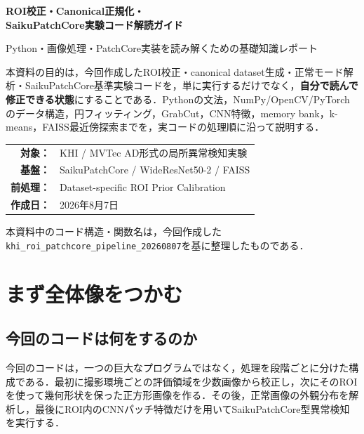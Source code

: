 \documentclass[a4paper,11pt]{ltjsreport}
\begin{document}
\begin{titlepage}
\centering
\vspace*{22mm}
{\Huge\bfseries\color{MainBlue} ROI校正・Canonical正規化・\\[2mm]SaikuPatchCore実験コード解読ガイド\par}
\vspace{8mm}
{\Large Python・画像処理・PatchCore実装を読み解くための基礎知識レポート\par}
\vspace{14mm}
\begin{tcolorbox}[width=0.88\linewidth,colback=LightGray,colframe=MainBlue,arc=2mm]
本資料の目的は，今回作成したROI校正・canonical dataset生成・正常モード解析・SaikuPatchCore基準実験コードを，単に実行するだけでなく，\textbf{自分で読んで修正できる状態}にすることである．Pythonの文法，NumPy/OpenCV/PyTorchのデータ構造，円フィッティング，GrabCut，CNN特徴，memory bank，k-means，FAISS最近傍探索までを，実コードの処理順に沿って説明する．
\end{tcolorbox}
\vfill
\begin{tabular}{rl}
\textbf{対象：} & KHI / MVTec AD形式の局所異常検知実験\\
\textbf{基盤：} & SaikuPatchCore / WideResNet50-2 / FAISS\\
\textbf{前処理：} & Dataset-specific ROI Prior Calibration\\
\textbf{作成日：} & 2026年8月7日
\end{tabular}
\vfill
{\small 本資料中のコード構造・関数名は，今回作成した\texttt{khi\_roi\_patchcore\_pipeline\_20260807}を基に整理したものである．}
\end{titlepage}

\tableofcontents
\clearpage

\chapter{まず全体像をつかむ}

\section{今回のコードは何をするのか}
今回のコードは，一つの巨大なプログラムではなく，処理を段階ごとに分けた構成である．最初に撮影環境ごとの評価領域を少数画像から校正し，次にそのROIを使って幾何形状を保った正方形画像を作る．その後，正常画像の外観分布を解析し，最後にROI内のCNNパッチ特徴だけを用いてSaikuPatchCore型異常検知を実行する．
\end{document}
